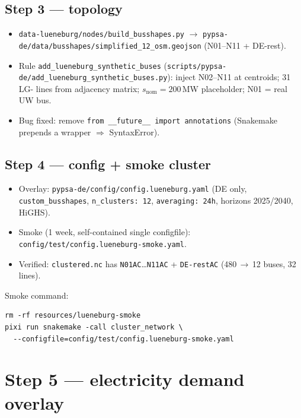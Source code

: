 \documentclass[11pt,a4paper]{article}
\begin{document}
\subsection{Step 3 --- topology}
\begin{itemize}[leftmargin=*]
  \item \texttt{data-lueneburg/nodes/build\_busshapes.py} $\to$
        \texttt{pypsa-de/data/busshapes/simplified\_12\_osm.geojson}
        (N01--N11 + DE-rest).
  \item Rule \texttt{add\_lueneburg\_synthetic\_buses}
        (\texttt{scripts/pypsa-de/add\_lueneburg\_synthetic\_buses.py}):
        inject N02--N11 at centroids; 31 LG- lines from adjacency matrix;
        $s_\mathrm{nom}=200$\,MW placeholder; N01 = real UW bus.
  \item Bug fixed: remove \texttt{from \_\_future\_\_ import annotations}
        (Snakemake prepends a wrapper $\Rightarrow$ SyntaxError).
\end{itemize}

\subsection{Step 4 --- config + smoke cluster}
\begin{itemize}[leftmargin=*]
  \item Overlay: \texttt{pypsa-de/config/config.lueneburg.yaml}
        (DE only, \texttt{custom\_busshapes}, \texttt{n\_clusters: 12},
        \texttt{averaging: 24h}, horizons 2025/2040, HiGHS).
  \item Smoke (1 week, self-contained single configfile):
        \texttt{config/test/config.lueneburg-smoke.yaml}.
  \item Verified: \texttt{clustered.nc} has
        \texttt{N01AC}\ldots\texttt{N11AC} + \texttt{DE-restAC}
        (480\,$\to$\,12 buses, 32 lines).
\end{itemize}

Smoke command:
\begin{lstlisting}
rm -rf resources/lueneburg-smoke
pixi run snakemake -call cluster_network \
  --configfile=config/test/config.lueneburg-smoke.yaml
\end{lstlisting}

\section{Step 5 --- electricity demand overlay}
\end{document}

